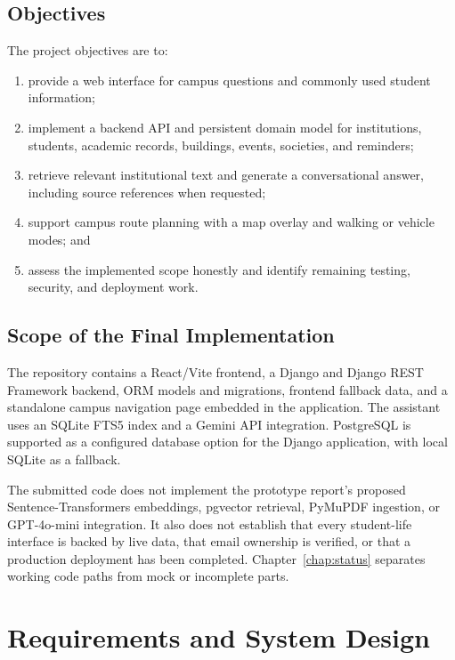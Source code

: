 \documentclass[11pt,a4paper]{report}
\begin{document}
\section{Objectives}
The project objectives are to:
\begin{enumerate}[leftmargin=*]
  \item provide a web interface for campus questions and commonly used student
    information;
  \item implement a backend API and persistent domain model for institutions,
    students, academic records, buildings, events, societies, and reminders;
  \item retrieve relevant institutional text and generate a conversational
    answer, including source references when requested;
  \item support campus route planning with a map overlay and walking or vehicle
    modes; and
  \item assess the implemented scope honestly and identify remaining testing,
    security, and deployment work.
\end{enumerate}

\section{Scope of the Final Implementation}
The repository contains a React/Vite frontend, a Django and Django REST
Framework backend, ORM models and migrations, frontend fallback data, and a
standalone campus navigation page embedded in the application. The assistant
uses an SQLite FTS5 index and a Gemini API integration. PostgreSQL is supported
as a configured database option for the Django application, with local SQLite
as a fallback.

The submitted code does not implement the prototype report's proposed
Sentence-Transformers embeddings, pgvector retrieval, PyMuPDF ingestion, or
GPT-4o-mini integration. It also does not establish that every student-life
interface is backed by live data, that email ownership is verified, or that a
production deployment has been completed. Chapter~\ref{chap:status}
separates working code paths from mock or incomplete parts.

\chapter{Requirements and System Design}
\end{document}
